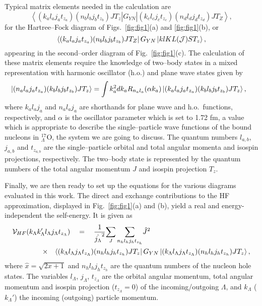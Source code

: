 Typical matrix elements needed in the calculation are
\begin{equation}
   \left\langle (k_al_aj_at_{z_a})(n_bl_bj_bt_{z_b})JT_z\right |
    G_{YN}\left | (k_cl_cj_ct_{z_c})(n_dl_dj_dt_{z_d})JT_Z \right\rangle,
\end{equation}
for the Hartree--Fock diagram of Figs.~\ref{fig:fig1}(a) and \ref{fig:fig1}(b), or
\begin{equation}
   \left\langle (k_al_aj_at_{z_a})(n_bl_bj_bt_{z_b})JT_Z \right |
    G_{YN}\left | klKL({\cal J})ST_z \right\rangle ,
\end{equation}
appearing in the second--order diagram of Fig.~\ref{fig:fig1}(c).
The calculation of these matrix elements
require the knowledge of two--body states in a mixed
representation with harmonic oscillator (h.o.) and plane wave states given by
\begin{equation}
\hspace{-0.3cm}\left | (n_al_aj_at_{z_a})(k_bl_bj_bt_{z_b})JT_z \right \rangle=
    \int k_a^2dk_aR_{n_al_a}(\alpha k_a)
    \left | (k_al_aj_at_{z_a})(k_bl_bj_bt_{z_b})JT_z \right \rangle,
\end{equation}
where
$k_al_aj_a$ and $n_al_aj_a$ are shorthands
for plane wave and h.o.\ functions, respectively, and
$\alpha$ is the oscillator parameter which is set to 1.72 fm, a value
which is appropriate to describe the single--particle wave functions of
the bound nucleons in $^{17}_{\Lambda}$O, the system we are going to discuss.
The quantum
numbers $l_{a,b}$,
$j_{a,b}$ and $t_{z_{a,b}}$ are
the single--particle orbital and total angular momenta and isospin
projections, respectively.
The two--body state
is represented by the quantum numbers of the total angular momentum
$J$ and isospin projection $T_z$.

Finally, we are then ready to set up the equations for the
various diagrams evaluated in this work. The direct and exchange
contributions to the HF approximation, displayed in Fig.\ \ref{fig:fig1}(a)
and (b), yield a real and energy-independent the self-energy. It is
given as
\begin{eqnarray}
\lefteqn{  {\cal V}_{HF}(k_{\Lambda}k_{\Lambda}'l_{\Lambda}j_{\Lambda}
   t_{z_{\Lambda}})\quad = \quad \frac{1}{\hat{j_{\Lambda}}^2}
  {\displaystyle \sum_{J}\sum_{n_hl_hj_ht_{z_h}}}\hat{J}^2}\hspace{1.5cm}
\nonumber \\
  & \times & \left\langle
(k_{\Lambda}l_{\Lambda}j_{\Lambda}t_{z_{\Lambda}})
  (n_hl_hj_ht_{z_h})JT_z \right |
   G_{YN}\left | (k_{\Lambda}l_{\Lambda}j_{\Lambda}t_{z_{\Lambda}})
   (n_hl_hj_ht_{z_h})JT_z \right \rangle ,
\label{eq:hf}
\end{eqnarray}
where $\hat{x}=\sqrt{2x+1}$ and $n_hl_hj_ht_{z_h}$ are the quantum numbers
of the nucleon hole states.
The variables
$l_{\Lambda}$, $j_{\Lambda}$, $t_{z_{\Lambda}}$ are the
orbital angular momentum, total angular momentum and isospin
projection ($t_{z_\Lambda} = 0$) of the incoming/outgoing
$\Lambda$, and
$k_{\Lambda}$ ($k_{\Lambda}'$) the incoming (outgoing)
particle momentum.


